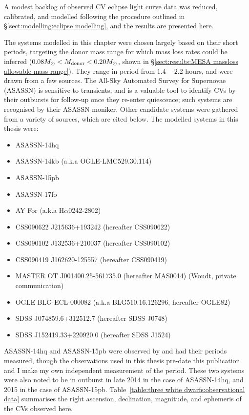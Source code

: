 \label{chpt:characterisation of 12 new CVs} %

A modest backlog of observed CV eclipse light curve data was reduced, calibrated, and modelled following the procedure outlined in \S\ref{sect:modelling:eclipse modelling}, and the results are presented here.

The systems modelled in this chapter were chosen largely based on their short periods, targeting the donor mass range for which mass loss rates could be inferred ($0.08 M_\odot < M_{\rm donor} < 0.20 M_\odot$, shown in \S\ref{sect:results:MESA massloss allowable mass range}). They range in period from $1.4 - 2.2$ hours, and were drawn from a few sources.
The All-Sky Automated Survey for Supernovae (ASASSN) \citep{shappee2014} is sensitive to transients, and is a valuable tool to identify CVs by their outbursts for follow-up once they re-enter quiescence; such systems are recognised by their ASASSN moniker.
Other candidate systems were gathered from a variety of sources, which are cited below.
The modelled systems in this thesis were:
\begin{itemize}
    \setlength\itemsep{0em}
    \item ASASSN-14hq
    \item ASASSN-14kb (a.k.a OGLE-LMC529.30.114)
    \item ASASSN-15pb
    \item ASASSN-17fo
    \item AY For (a.k.a H$\alpha$0242-2802) \citep{woudt2004}
    \item CSS090622 J215636+193242 (hereafter CSS090622) \citep{kato2012,thorstensen2016}
    \item CSS090102 J132536+210037 (hereafter CSS090102) \citep{kato2012}
    \item CSS090419 J162620-125557 (hereafter CSS090419) \citep{kato2012}
    \item MASTER OT J001400.25-561735.0 (hereafter MAS0014) (Woudt, private communication)
    \item OGLE BLG-ECL-000082 (a.k.a BLG510.16.126296, hereafter OGLE82) \citep{soszynski2016}
    \item SDSS J074859.6+312512.7 (hereafter SDSS J0748) \citep{kato2016}
    \item SDSS J152419.33+220920.0 (hereafter SDSS J1524) \citep{southworth2010,michel2013}
\end{itemize}
\newpage
ASASSN-14hq and ASASSN-15pb were observed by \citet{paterson2019} and had their periods measured, though the observations used in this thesis pre-date this publication and I make my own independent measurement of the period.
These two systems were also noted to be in outburst in late 2014 in the case of ASASSN-14hq, and 2015 in the case of ASASSN-15pb.
Table~\ref{table:three white dwarfs:observational data} summarises the right ascension, declination, magnitude, and ephemeris of the CVs observed here.

